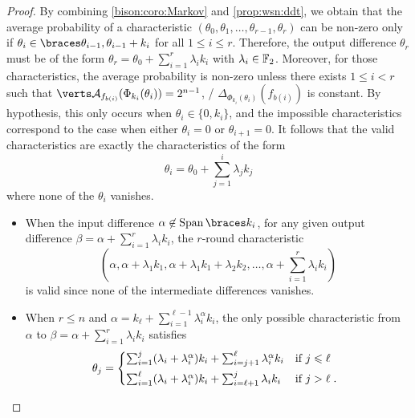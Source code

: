 \begin{proof}
    By combining \cref{bison:coro:Markov} and \cref{prop:wsn:ddt}, we obtain that the average probability of a characteristic $(\theta_0, \theta_1, \ldots, \theta_{r-1}, \theta_r)$ can be non-zero only if $\theta_i \in \set{\theta_{i-1}, \theta_{i-1}+k_i}$ for all $1 \leqslant i \leqslant r$.
    Therefore, the output difference $\theta_r$ must be of the form
    $\theta_r= \theta_0 + \sum_{i=1}^r \lambda_i k_i$ with $\lambda_i \in \mathbb{F}_2$.
    Moreover, for those characteristics, the average probability is non-zero unless there exists $1 \leqslant i < r$ such that $\abs{\AC{f_{b(i)}}(\Phi_{k_i}(\theta_i))} = 2^{n-1}$, \ie/ $\Delta_{\Phi_{k_i}(\theta_i)}(f_{b(i)})$ is constant.
    By hypothesis, this only occurs when $\theta_i \in \{0,k_i\}$, and the impossible characteristics correspond to the case when either $\theta_i=0$ or $\theta_{i+1}=0$.
    It follows that the valid characteristics are exactly the characteristics of the form
    \begin{equation*}
        \theta_i = \theta_0 + \sum_{j=1}^i \lambda_j k_j
    \end{equation*}
    where none of the $\theta_i$ vanishes.
\begin{itemize}
    \item When the input difference $\alpha \not \in \Span{k_i}$, for any given output difference $\beta = \alpha + \sum_{i=1}^r \lambda_i k_i$, the $r$-round characteristic
          \begin{equation*}
              (\alpha, \alpha + \lambda_1 k_1, \alpha+ \lambda_1 k_1+ \lambda_2 k_2, \ldots, \alpha + \sum_{i=1}^r \lambda_i k_i)
          \end{equation*}
          is valid since none of the intermediate differences vanishes.
    \item When $r \leqslant n$ and $\alpha = k_\ell + \sum_{i=1}^{\ell-1} \lambda_i^\alpha k_i$, the only possible characteristic from $\alpha$ to $\beta = \alpha + \sum_{i=1}^r \lambda_i k_i$ satisfies
          \begin{equation*}
              \theta_j = \begin{cases*}
                  \sum_{i=1}^{j} (\lambda_i + \lambda_i^\alpha)k_i + \sum_{i=j+1}^\ell \lambda_i^\alpha k_i & if $j \leqslant \ell$\\
                  \sum_{i=1}^{\ell} (\lambda_i + \lambda_i^\alpha)k_i + \sum_{i=\ell+1}^j \lambda_i k_i & if $j > \ell$\;.
              \end{cases*}
          \end{equation*}

\end{itemize}
\end{proof}

